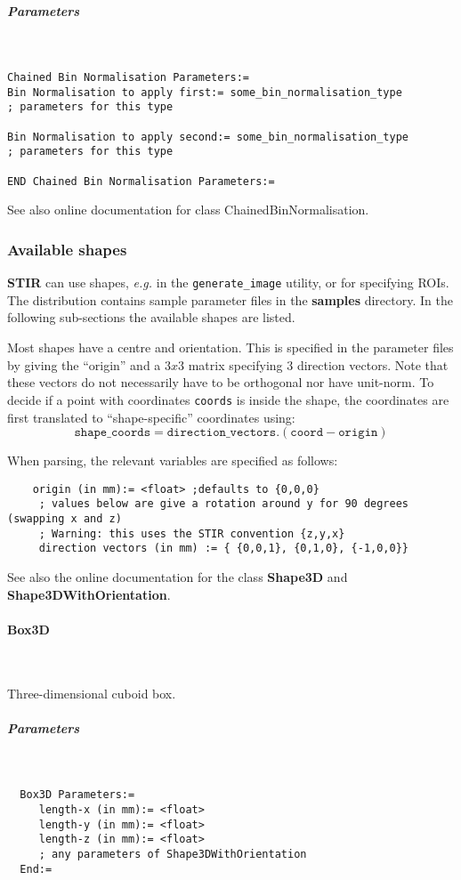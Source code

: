 \documentclass{article}
\newcommand{\subsubsubsection}[1]{\paragraph{#1}\mbox{} \\}
\newcommand{\subsubsubsubsection}[1]{\subparagraph{#1} \mbox{} \\}
\begin{document}
{{ \subsubsubsubsection{Parameters}
}
\begin{verbatim}
Chained Bin Normalisation Parameters:=
Bin Normalisation to apply first:= some_bin_normalisation_type
; parameters for this type

Bin Normalisation to apply second:= some_bin_normalisation_type
; parameters for this type

END Chained Bin Normalisation Parameters:=
\end{verbatim}

See also online documentation for class ChainedBinNormalisation.

\subsubsection{
Available shapes}
\label{sec:shapes}
\textbf{STIR} can use shapes, \textit{e.g.} in the \texttt{generate\_image}
utility, or for specifying ROIs. The distribution contains sample parameter files in the
\textbf{samples} directory. In the following sub-sections the available shapes are listed.

Most shapes have a centre and orientation. This is specified in the parameter files
by giving the ``origin'' and a $3x3$ matrix specifying $3$ direction vectors.
Note that these vectors do not necessarily have to be orthogonal nor have unit-norm.
To decide if a point with coordinates \texttt{coords} is inside the shape, the
coordinates are first translated to ``shape-specific'' coordinates using:
\[
\mathtt{shape\_coords} = \mathtt{direction\_vectors}. (\mathtt{coord}-\mathtt{origin})
\]

When parsing, the relevant variables are specified as follows:
\begin{verbatim}
    origin (in mm):= <float> ;defaults to {0,0,0}
     ; values below are give a rotation around y for 90 degrees (swapping x and z)
     ; Warning: this uses the STIR convention {z,y,x}
     direction vectors (in mm) := { {0,0,1}, {0,1,0}, {-1,0,0}}
\end{verbatim}

See also the online documentation for the class \textbf{Shape3D} and
\textbf{Shape3DWithOrientation}.

{ \subsubsubsection{Box3D}
}
Three-dimensional cuboid box.
{ \subsubsubsubsection{Parameters}
}
\begin{verbatim}
  Box3D Parameters:=
     length-x (in mm):= <float>
     length-y (in mm):= <float>
     length-z (in mm):= <float>
     ; any parameters of Shape3DWithOrientation
  End:=
\end{verbatim}

}
\end{document}

